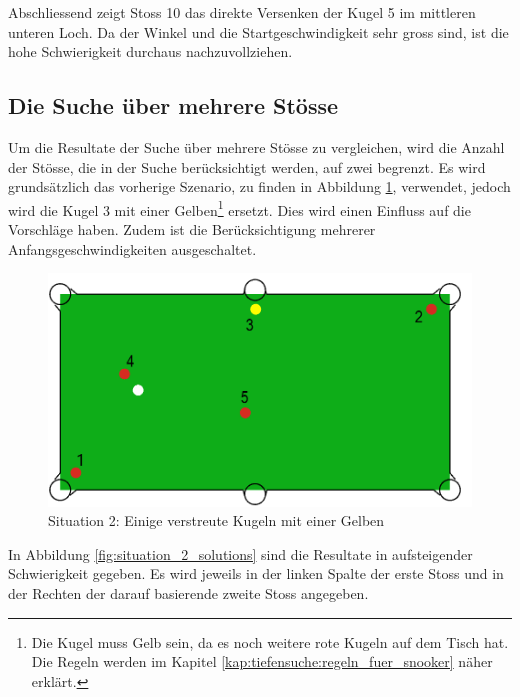 Abschliessend zeigt Stoss 10 das direkte Versenken der Kugel 5 im mittleren unteren Loch.
Da der Winkel und die Startgeschwindigkeit sehr gross sind, ist die hohe Schwierigkeit durchaus nachzuvollziehen.

\newpage
\subsection{Die Suche über mehrere Stösse}
Um die Resultate der Suche über mehrere Stösse zu vergleichen, wird die Anzahl der Stösse, die in der Suche
berücksichtigt werden, auf zwei begrenzt. Es wird grundsätzlich das vorherige Szenario, zu finden in Abbildung
\ref{fig:search_situation_2}, verwendet, jedoch wird die
Kugel 3 mit einer Gelben\footnote{Die Kugel muss Gelb sein, da es noch weitere rote Kugeln auf dem Tisch hat. Die
Regeln werden im Kapitel \ref{kap:tiefensuche:regeln_fuer_snooker} näher erklärt.} ersetzt. Dies wird
einen Einfluss auf die Vorschläge haben. Zudem ist die Berücksichtigung mehrerer Anfangsgeschwindigkeiten ausgeschaltet.

%
%
\begin{figure}[h!]
    \begin{center}
        \includegraphics[width=0.4\linewidth]{../common/04_results/resources/simple_search/situation_diverse_deep_search.PNG}
    \end{center}
    \caption{Situation 2: Einige verstreute Kugeln mit einer Gelben}
    \label{fig:search_situation_2}
\end{figure}

In Abbildung \ref{fig:situation_2_solutions} sind die Resultate in aufsteigender Schwierigkeit gegeben. Es wird
jeweils in der linken Spalte der erste Stoss und in der Rechten der darauf basierende zweite Stoss angegeben.

